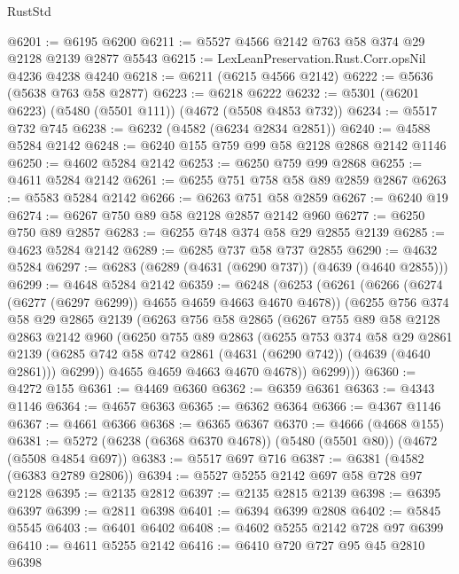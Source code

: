 \begin{lexlean}{RustStd}
\begin{coremodule}
{\begin{coremodule}
{{{{{{{{{{{{{{{{@6201 := @6195 @6200
@6211 := @5527 @4566 @2142 @763 @58 @374 @29 @2128 @2139 @2877 @5543
@6215 := LexLeanPreservation.Rust.Corr.opsNil @4236 @4238 @4240
@6218 := @6211 (@6215 @4566 @2142)
@6222 := @5636 (@5638 @763 @58 @2877)
@6223 := @6218 @6222
@6232 := @5301 (@6201 @6223) (@5480 (@5501 @111)) (@4672 (@5508 @4853 @732))
@6234 := @5517 @732 @745
@6238 := @6232 (@4582 (@6234 @2834 @2851))
@6240 := @4588 @5284 @2142
@6248 := @6240 @155 @759 @99 @58 @2128 @2868 @2142 @1146
@6250 := @4602 @5284 @2142
@6253 := @6250 @759 @99 @2868
@6255 := @4611 @5284 @2142
@6261 := @6255 @751 @758 @58 @89 @2859 @2867
@6263 := @5583 @5284 @2142
@6266 := @6263 @751 @58 @2859
@6267 := @6240 @19
@6274 := @6267 @750 @89 @58 @2128 @2857 @2142 @960
@6277 := @6250 @750 @89 @2857
@6283 := @6255 @748 @374 @58 @29 @2855 @2139
@6285 := @4623 @5284 @2142
@6289 := @6285 @737 @58 @737 @2855
@6290 := @4632 @5284
@6297 := @6283 (@6289 (@4631 (@6290 @737)) (@4639 (@4640 @2855)))
@6299 := @4648 @5284 @2142
@6359 := @6248
    (@6253
      (@6261
        (@6266 (@6274 (@6277 (@6297 @6299)) @4655 @4659 @4663 @4670 @4678))
        (@6255
          @756
          @374
          @58
          @29
          @2865
          @2139
          (@6263
            @756
            @58
            @2865
            (@6267
              @755
              @89
              @58
              @2128
              @2863
              @2142
              @960
              (@6250
                @755
                @89
                @2863
                (@6255
                  @753
                  @374
                  @58
                  @29
                  @2861
                  @2139
                  (@6285 @742 @58 @742 @2861 (@4631 (@6290 @742)) (@4639 (@4640 @2861)))
                  @6299))
              @4655
              @4659
              @4663
              @4670
              @4678))
          @6299)))
@6360 := @4272 @155
@6361 := @4469 @6360
@6362 := @6359 @6361
@6363 := @4343 @1146
@6364 := @4657 @6363
@6365 := @6362 @6364
@6366 := @4367 @1146
@6367 := @4661 @6366
@6368 := @6365 @6367
@6370 := @4666 (@4668 @155)
@6381 := @5272 (@6238 (@6368 @6370 @4678)) (@5480 (@5501 @80)) (@4672 (@5508 @4854 @697))
@6383 := @5517 @697 @716
@6387 := @6381 (@4582 (@6383 @2789 @2806))
@6394 := @5527 @5255 @2142 @697 @58 @728 @97 @2128
@6395 := @2135 @2812
@6397 := @2135 @2815 @2139
@6398 := @6395 @6397
@6399 := @2811 @6398
@6401 := @6394 @6399 @2808
@6402 := @5845 @5545
@6403 := @6401 @6402
@6408 := @4602 @5255 @2142 @728 @97 @6399
@6410 := @4611 @5255 @2142
@6416 := @6410 @720 @727 @95 @45 @2810 @6398
}}}}}}}}}}}}}}}}
\end{coremodule}}
\end{coremodule}
\end{lexlean}

